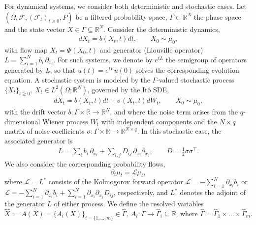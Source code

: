 \documentclass[11pt, a4paper, oneside, reqno]{amsart}
\begin{document}
\noindent For dynamical systems, we consider both deterministic and stochastic cases.
Let $(\Omega, \mathcal{F},(\mathcal{F}_t)_{t\geq 0},P)$ be a filtered probability space, $\Gamma \subset\mathbb{R}^N$ the phase space and the state vector $X\in\Gamma\subseteq\mathbb{R}^N$.
Consider the deterministic dynamics,
\begin{eqnarray}\label{eq:ode assumption}
    dX_t = b(X_t,t)dt, \qquad    X_0\sim \mu_0,
\end{eqnarray}
with flow map $X_t=\Phi(X_0,t)$ and generator (Liouville operator) $L=\sum_{i=1}^N b_i \,\partial_{x_i}$. For such systems, we denote by $e^{tL}$ the semigroup of operators generated by $L$, so that $u(t)=e^{tL}u(0)$ solves the corresponding evolution equation.
A stochastic system is modeled by the $\Gamma$-valued stochastic process $\{X_t\}_{t\geq 0}, \ X_t\in L^2(\Omega;\mathbb{R}^N)$, governed by the Itô SDE,
\begin{eqnarray}\label{eq:sde assumption}
    dX_t = b(X_t,t)dt + \sigma(X_t,t)dW_t,\qquad    X_0\sim \mu_0,
\end{eqnarray}
with the drift vector $b:\Gamma\times\mathbb{R}\rightarrow\mathbb{R}^N$, and where the noise term arises from the $q$-dimensional Wiener process $W_t$ with independent components and the $N\times q$ matrix of noise coefficients $\sigma:\Gamma\times\mathbb{R}\rightarrow \mathbb{R}^{N\times q}$. In this stochastic case, the associated generator is
\begin{eqnarray}
    L=\sum_i b_i \,\partial_{x_i} + \sum_{i,j} D_{ij}\,\partial_{x_i}\partial_{x_j}, \qquad D=\tfrac12 \sigma\sigma^\top .
\end{eqnarray}
We also consider the corresponding probability flows,
\begin{equation}\label{eq:mut}
    \partial_t\mu_t=\mathcal{L}\mu_t,
\end{equation}
where $\mathcal{L}=L^*$ consists of the Kolmogorov forward operator $\mathcal{L}=-\sum_{i=1}^N\partial_{x_i}b_i$ or $\mathcal{L}=-\sum_{i=1}^N\partial_{x_i}b_i+\sum_{i=1}^N\partial_{x_i}\partial_{x_j}D_{ij}$, respectively, and $L^*$ denotes the adjoint of the generator $L$ of either process.
We define the resolved variables $\hat{X}:=A(X)=\{A_i(X)\}_{i=\{1,\dots,m\}}\in\hat{\Gamma}, \ A_i:\Gamma\to\hat{\Gamma}_i\subseteq\mathbb{R}$, where $\hat{\Gamma}=\hat{\Gamma}_1\times\dots\times\hat{\Gamma}_m$.
\end{document}
